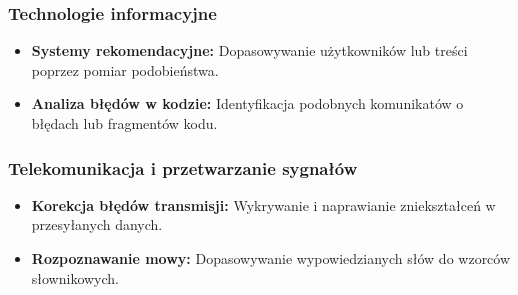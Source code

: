 \subsubsection*{Technologie informacyjne}
\begin{itemize}
    \item \textbf{Systemy rekomendacyjne:} Dopasowywanie użytkowników lub treści poprzez pomiar podobieństwa.
    \item \textbf{Analiza błędów w kodzie:} Identyfikacja podobnych komunikatów o błędach lub fragmentów kodu.
\end{itemize}

\subsubsection*{Telekomunikacja i przetwarzanie sygnałów}
\begin{itemize}
    \item \textbf{Korekcja błędów transmisji:} Wykrywanie i naprawianie zniekształceń w przesyłanych danych.
    \item \textbf{Rozpoznawanie mowy:} Dopasowywanie wypowiedzianych słów do wzorców słownikowych.
\end{itemize}